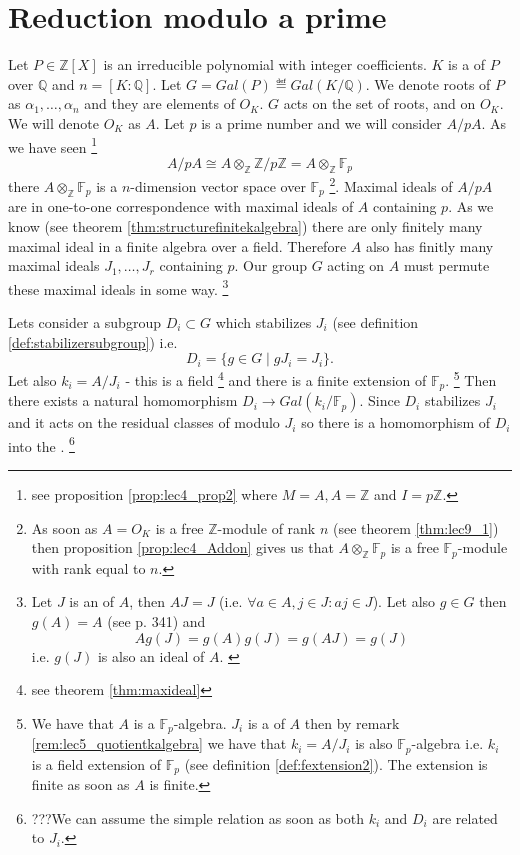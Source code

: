\section{Reduction modulo a prime}

Let $P \in \mathbb{Z}\left[X\right]$ is an irreducible polynomial with integer
coefficients. $K$ is a  of $P$ over
$\mathbb{Q}$ and $n = \left[K:\mathbb{Q}\right]$. Let
$G = Gal\left(P\right) \eqdef Gal\left(K/\mathbb{Q}\right)$. We denote
roots of $P$ as $\alpha_1, \dots, \alpha_n$ and they are elements of
$O_K$. $G$ acts on the set of roots, and on $O_K$. We will denote
$O_K$ as $A$. Let $p$ is a prime number and we will consider $A/pA$.
As we have seen
\footnote{
  see proposition \ref{prop:lec4_prop2} where $M = A, A=\mathbb{Z}$
  and $I = p\mathbb{Z}$.
}
\[
A/pA \cong A \otimes_{\mathbb{Z}} \mathbb{Z}/p\mathbb{Z} =
A \otimes_{\mathbb{Z}} \mathbb{F}_p
\]
there $A \otimes_{\mathbb{Z}} \mathbb{F}_p$ is a 
$n$-dimension vector space over $\mathbb{F}_p$
\footnote{
  As soon as $A=O_K$ is a free
  $\mathbb{Z}$-module of rank $n$ (see theorem \ref{thm:lec9_1}) then
  proposition 
  \ref{prop:lec4_Addon} gives us that $A \otimes_{\mathbb{Z}}
  \mathbb{F}_p$ is a free $\mathbb{F}_p$-module with rank equal
  to $n$.
}.
Maximal ideals
of $A/pA$ are in one-to-one correspondence with maximal ideals of $A$
containing $p$. As we know (see theorem
\ref{thm:structurefinitekalgebra}) there are only finitely many
maximal ideal in a finite algebra over a field. Therefore $A$ also has
finitly many 
maximal ideals $J_1, \dots, J_r$ containing $p$. Our group $G$ acting
on $A$ must permute these maximal ideals in some way.
\footnote{
  Let $J$ is an  of $A$, then $A J = J$
  (i.e. $\forall a \in A, j \in J: aj \in J$). Let also $g \in G$ then
  $g\left(A\right) = A$ (see \cite{bib:lang} p. 341) and
  \[
  A g\left(J\right) = g\left(A\right) g\left(J\right) =
  g\left(AJ\right) = g\left(J\right)
  \]
  i.e. $g\left(J\right)$ is also an ideal of $A$.
  \label{note:lec9_permute_ideal}
}

Lets consider a subgroup $D_i \subset G$ which stabilizes $J_i$ (see
definition \ref{def:stabilizersubgroup}) i.e.
\[
D_i = \{g \in G \mid g J_i = J_i\}.
\]
Let also $k_i = A/J_i$ - this is a field
\footnote{
  see theorem \ref{thm:maxideal}
}
and there is a finite
extension of $\mathbb{F}_p$.
\footnote{
  We have that $A$ is a $\mathbb{F}_p$-algebra. $J_i$ is a
   of $A$ then by remark
  \ref{rem:lec5_quotientkalgebra} we have that $k_i = A/J_i$ is also
  $\mathbb{F}_p$-algebra i.e. $k_i$ is a field extension of
  $\mathbb{F}_p$ (see definition \ref{def:fextension2}). The extension
  is finite as soon as $A$ is finite.
}
Then there exists a natural homomorphism
\(
D_i \to Gal\left(k_i/\mathbb{F}_p\right)
\).
Since $D_i$ stabilizes $J_i$ and it acts on the residual classes of
modulo $J_i$ so there is a homomorphism of $D_i$ into the
.
\footnote{
  ???We can assume the simple relation as soon as both $k_i$ and $D_i$
  are related to $J_i$. 
}


